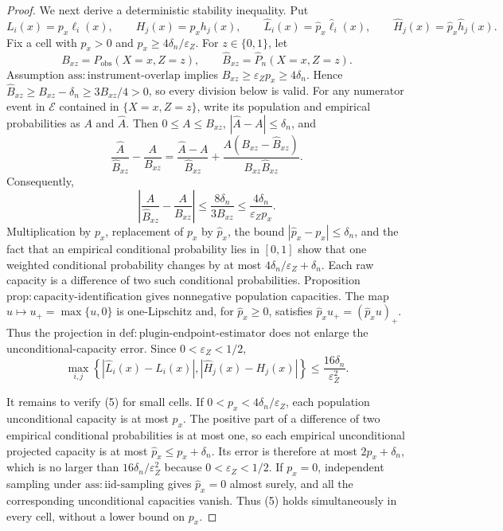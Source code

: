 \documentclass{article}
\begin{document}
\begin{proof}
We next derive a deterministic stability inequality.  Put
\[
L_i(x)=p_x\ell_i(x),\qquad H_j(x)=p_xh_j(x),\qquad
\widehat L_i(x)=\widehat p_x\widehat\ell_i(x),\qquad
\widehat H_j(x)=\widehat p_x\widehat h_j(x).
\]
Fix a cell with \(p_x>0\) and \(p_x\ge4\delta_n/\varepsilon_Z\).  For \(z\in\{0,1\}\), let
\[
B_{xz}=P_{\mathrm{obs}}(X=x,Z=z),\qquad
\widehat B_{xz}=\widehat P_n(X=x,Z=z).
\]
Assumption \(\mathrm{ass{:}instrument\text{-}overlap}\) implies \(B_{xz}\ge\varepsilon_Zp_x\ge4\delta_n\).  Hence \(\widehat B_{xz}\ge B_{xz}-\delta_n\ge3B_{xz}/4>0\), so every division below is valid.  For any numerator event in \(\mathcal E\) contained in \(\{X=x,Z=z\}\), write its population and empirical probabilities as \(A\) and \(\widehat A\).  Then \(0\le A\le B_{xz}\), \(|\widehat A-A|\le\delta_n\), and
\[
\frac{\widehat A}{\widehat B_{xz}}-\frac{A}{B_{xz}}
=\frac{\widehat A-A}{\widehat B_{xz}}
+\frac{A(B_{xz}-\widehat B_{xz})}
        {B_{xz}\widehat B_{xz}}.
\]
Consequently,
\[
\left|\frac{\widehat A}{\widehat B_{xz}}-
             \frac{A}{B_{xz}}\right|
\le\frac{8\delta_n}{3B_{xz}}
\le\frac{4\delta_n}{\varepsilon_Zp_x}.
\tag{4}
\]
Multiplication by \(p_x\), replacement of \(p_x\) by \(\widehat p_x\), the bound \(|\widehat p_x-p_x|\le\delta_n\), and the fact that an empirical conditional probability lies in \([0,1]\) show that one weighted conditional probability changes by at most \(4\delta_n/\varepsilon_Z+\delta_n\).  Each raw capacity is a difference of two such conditional probabilities.  Proposition \(\mathrm{prop{:}capacity\text{-}identification}\) gives nonnegative population capacities.  The map \(u\mapsto u_+=\max\{u,0\}\) is one-Lipschitz and, for \(\widehat p_x\ge0\), satisfies \(\widehat p_xu_+=(\widehat p_xu)_+\).  Thus the projection in \(\mathrm{def{:}plugin\text{-}endpoint\text{-}estimator}\) does not enlarge the unconditional-capacity error.  Since \(0<\varepsilon_Z<1/2\),
\[
\max_{i,j}\left\{|\widehat L_i(x)-L_i(x)|,
                    |\widehat H_j(x)-H_j(x)|\right\}
\le\frac{16\delta_n}{\varepsilon_Z^2}.
\tag{5}
\]

It remains to verify (5) for small cells.  If \(0<p_x<4\delta_n/\varepsilon_Z\), each population unconditional capacity is at most \(p_x\).  The positive part of a difference of two empirical conditional probabilities is at most one, so each empirical unconditional projected capacity is at most \(\widehat p_x\le p_x+\delta_n\).  Its error is therefore at most \(2p_x+\delta_n\), which is no larger than \(16\delta_n/\varepsilon_Z^2\) because \(0<\varepsilon_Z<1/2\).  If \(p_x=0\), independent sampling under \(\mathrm{ass{:}iid\text{-}sampling}\) gives \(\widehat p_x=0\) almost surely, and all the corresponding unconditional capacities vanish.  Thus (5) holds simultaneously in every cell, without a lower bound on \(p_x\).


\end{proof}
\end{document}

